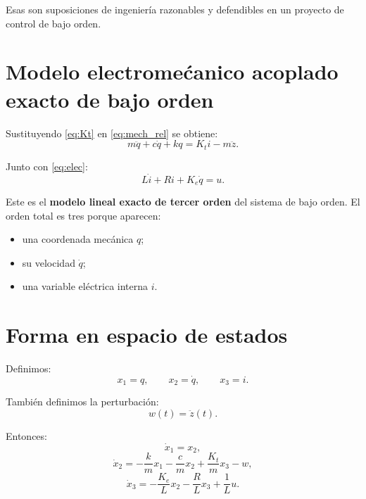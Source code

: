 \documentclass[11pt]{article}
\begin{document}
Esas son suposiciones de ingenier\'ia razonables y defendibles en un proyecto de control de bajo orden.

\section{Modelo electrome\'canico acoplado exacto de bajo orden}

Sustituyendo \eqref{eq:Kt} en \eqref{eq:mech_rel} se obtiene:
\begin{equation}
m\ddot q + c\dot q + kq = K_t i - m\ddot z.
\label{eq:mech_exact}
\end{equation}

Junto con \eqref{eq:elec}:
\begin{equation}
L\dot i + Ri + K_e\dot q = u.
\label{eq:elec_exact}
\end{equation}

Este es el \textbf{modelo lineal exacto de tercer orden} del sistema de bajo orden. El orden total es tres porque aparecen:

\begin{itemize}[leftmargin=1.2cm]
\item una coordenada mec\'anica $q$;
\item su velocidad $\dot q$;
\item una variable el\'ectrica interna $i$.
\end{itemize}

\section{Forma en espacio de estados}

Definimos:
\[
x_1=q,\qquad x_2=\dot q,\qquad x_3=i.
\]

Tambi\'en definimos la perturbaci\'on:
\[
w(t)=\ddot z(t).
\]

Entonces:
\begin{equation}
\dot x_1 = x_2,
\end{equation}
\begin{equation}
\dot x_2 = -\frac{k}{m}x_1-\frac{c}{m}x_2+\frac{K_t}{m}x_3-w,
\end{equation}
\begin{equation}
\dot x_3 = -\frac{K_e}{L}x_2-\frac{R}{L}x_3+\frac{1}{L}u.
\end{equation}
\end{document}
